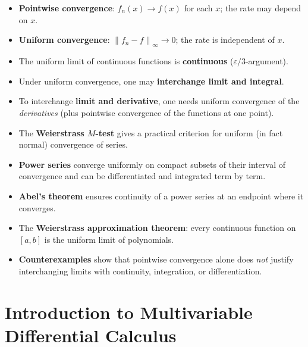\documentclass[12pt,a4paper]{book}
\theoremstyle{definition}
\newcommand{\eps}{\varepsilon}
\newcommand{\norm}[1]{\left\lVert #1 \right\rVert}
\begin{document}
\bigskip
\begin{tcolorbox}[colback=gray!5, colframe=gray!60, title={\textbf{Chapter 8 --- Summary}}]
\begin{itemize}[leftmargin=*]
  \item \textbf{Pointwise convergence}: $f_n(x)\to f(x)$ for each $x$;
    the rate may depend on $x$.
  \item \textbf{Uniform convergence}: $\norm{f_n-f}_\infty\to0$; the
    rate is independent of $x$.
  \item The uniform limit of continuous functions is \textbf{continuous}
    ($\eps/3$-argument).
  \item Under uniform convergence, one may \textbf{interchange limit and
    integral}.
  \item To interchange \textbf{limit and derivative}, one needs uniform
    convergence of the \emph{derivatives} (plus pointwise convergence of
    the functions at one point).
  \item The \textbf{Weierstrass $M$-test} gives a practical criterion for
    uniform (in fact normal) convergence of series.
  \item \textbf{Power series} converge uniformly on compact subsets of
    their interval of convergence and can be differentiated and
    integrated term by term.
  \item \textbf{Abel's theorem} ensures continuity of a power series at
    an endpoint where it converges.
  \item The \textbf{Weierstrass approximation theorem}: every continuous
    function on $[a,b]$ is the uniform limit of polynomials.
  \item \textbf{Counterexamples} show that pointwise convergence alone
    does \emph{not} justify interchanging limits with continuity,
    integration, or differentiation.
\end{itemize}
\end{tcolorbox}



\chapter{Introduction to Multivariable Differential Calculus}
\label{ch:multivariable-calculus}
\end{document}
